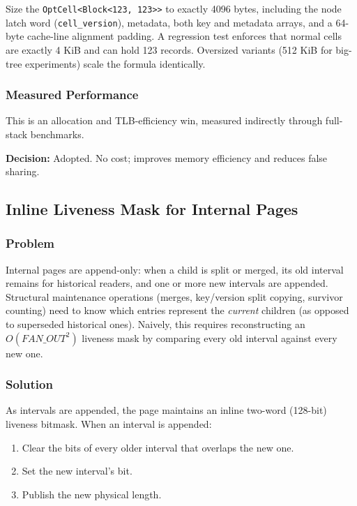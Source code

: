 \documentclass[11pt]{article}
\newcommand{\code}[1]{\texttt{#1}}
\begin{document}
Size the \code{OptCell<Block<123, 123>>} to exactly 4096 bytes, including the node latch
word (\code{cell\_version}), metadata, both key and metadata arrays, and a 64-byte cache-line
alignment padding. A regression test enforces that normal cells are exactly 4 KiB and can hold
123 records. Oversized variants (512 KiB for big-tree experiments) scale the formula identically.

\subsubsection{Measured Performance}

This is an allocation and TLB-efficiency win, measured indirectly through full-stack
benchmarks.

\textbf{Decision:} Adopted. No cost; improves memory efficiency and reduces false sharing.

\subsection{Inline Liveness Mask for Internal Pages}

\subsubsection{Problem}

Internal pages are append-only: when a child is split or merged, its old interval remains
for historical readers, and one or more new intervals are appended. Structural maintenance
operations (merges, key/version split copying, survivor counting) need to know which entries
represent the \emph{current} children (as opposed to superseded historical ones). Naively,
this requires reconstructing an $O(\textit{FAN\_OUT}^2)$ liveness mask by comparing every
old interval against every new one.

\subsubsection{Solution}

As intervals are appended, the page maintains an inline two-word (128-bit) liveness bitmask.
When an interval is appended:

\begin{enumerate}
  \item Clear the bits of every older interval that overlaps the new one.
  \item Set the new interval's bit.
  \item Publish the new physical length.
\end{enumerate}
\end{document}
